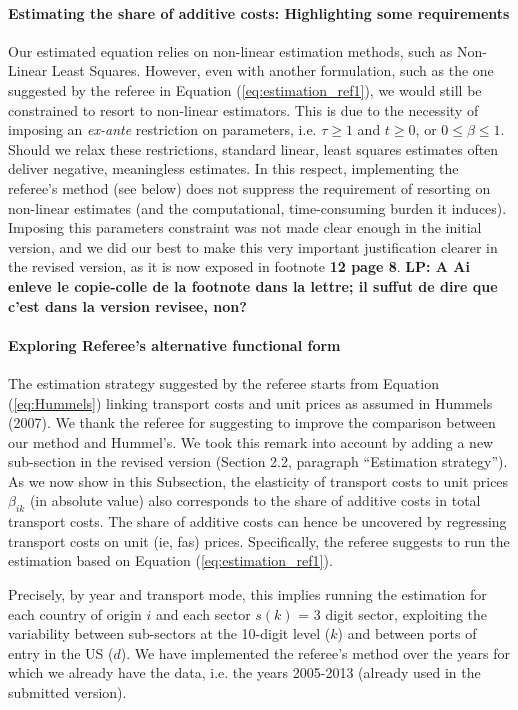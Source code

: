 \documentclass[a4paper,11pt]{article}
\begin{document}
\paragraph{Estimating the share of additive costs: Highlighting some requirements} Our estimated equation relies on non-linear estimation methods, such as Non-Linear Least Squares. However, even with another formulation, such as the one suggested by the referee in Equation (\ref{eq:estimation_ref1}), we would still be constrained to resort to non-linear estimators. This is due to the necessity of imposing an \textit{ex-ante} restriction on parameters, i.e. $\tau \geq 1$ and $t \geq 0$, or $0 \leq  \beta \leq 1$. Should we relax these restrictions, standard linear, least squares estimates often deliver negative, meaningless estimates. In this respect, implementing the referee's method (see below) does not suppress the requirement of resorting on non-linear estimates (and the computational, time-consuming burden it induces). Imposing this parameters constraint was not made clear enough in the initial version, and we did our best to make this very important justification clearer in the revised version, as it is now exposed in footnote \textbf{12 page 8}. \textbf{LP: A Ai enleve le copie-colle de la footnote dans la lettre; il suffut de dire que c'est dans la version revisee, non?}\smallskip


\paragraph{Exploring Referee's alternative functional form \label{subsec:functional_form}}

The estimation strategy suggested by the referee starts from Equation (\ref{eq:Hummels}) linking transport costs and unit prices as assumed in Hummels (2007). We thank the referee for suggesting to improve the comparison between our method and Hummel's. We took this remark into account by adding a new sub-section in the revised version (Section 2.2, paragraph ``Estimation strategy''). As we now show in this Subsection, the elasticity of transport costs to unit prices $\beta_{ik}$ (in absolute value) also corresponds to the share of additive costs in total transport costs. The share of additive costs can hence be uncovered by regressing transport costs on unit (ie, fas) prices. Specifically, the referee suggests to run the estimation based on Equation (\ref{eq:estimation_ref1}).

Precisely, by year and transport mode, this implies running the estimation for each country of origin $i$ and each sector $s(k)$ = 3 digit sector, exploiting the variability between sub-sectors at the 10-digit level ($k$) and between ports of entry in the US ($d$). We have implemented the referee's method over the years for which we already have the data, i.e. the years 2005-2013 (already used in the submitted version).
\end{document}
